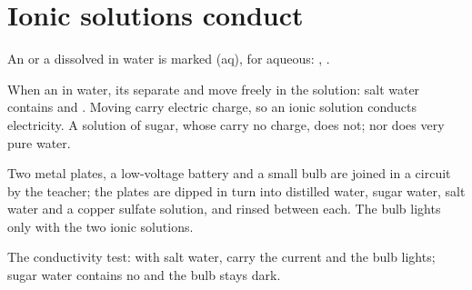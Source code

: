 \section{Ionic solutions conduct}

\begin{notation}\label{not:g9:ions:aq}
An  or a  dissolved in water is marked (aq), for aqueous:
, .
\end{notation}

\begin{proposition}\label{prop:g9:ions:conduct}
When an   in water, its  separate and move
freely in the solution: salt water contains  and
. Moving  carry electric charge, so an ionic solution
conducts electricity. A solution of sugar, whose  carry no
charge, does not; nor does very pure water.
\end{proposition}

\begin{inthelab}
Two metal plates, a low-voltage battery and a small bulb are joined in a
circuit by the teacher; the plates are dipped in turn into distilled
water, sugar water, salt water and a copper sulfate solution, and rinsed
between each. The bulb lights only with the two ionic solutions.
\end{inthelab}

\begin{omfigure}

{\small The conductivity test: with salt water,  carry the current
and the bulb lights; sugar water contains no  and the bulb stays
dark.}
\end{omfigure}

